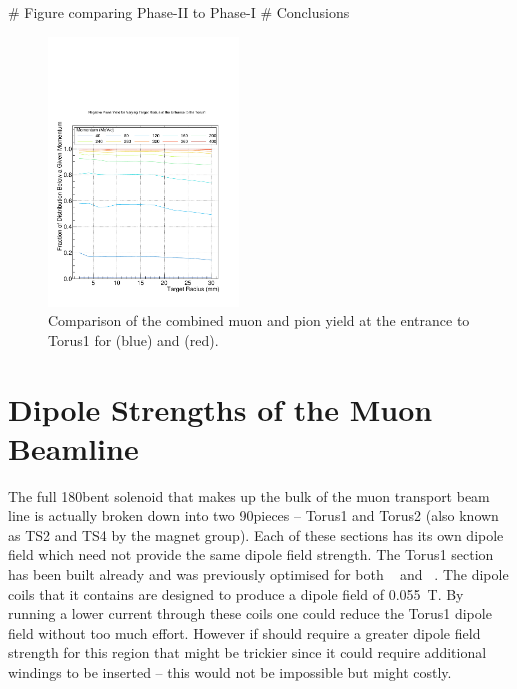 \begin{easylist}
	# Figure comparing Phase-II to Phase-I
	# Conclusions
\end{easylist}

\begin{figure}[t]
\centering
\includegraphics[width=0.45\textwidth,trim=0 0 0 1.5cm,clip]{figs/optimisation/ProdTgtGeom/Radius_pi-minus_integral_ratios}
\caption{
Comparison of the combined muon and pion yield at the entrance to Torus1 for \phaseI (blue) and \phaseII (red).
}
\end{figure}

\section{Dipole Strengths of the Muon Beamline}

The full 180\degree bent solenoid that makes up the bulk of the muon transport beam line is actually broken down into two
90\degree pieces -- Torus1 and Torus2 (also known as TS2 and TS4 by the magnet group).
Each of these sections has its own dipole field which need not provide the same dipole field strength.
The Torus1 section has been built already and was previously optimised for both \phaseI~\cite{TDR2016} and \phaseII~\cite{CDRphase2}. 
The dipole coils that it contains are designed to produce a dipole field of 0.055~T.
By running a lower current through these coils one could reduce the Torus1 dipole field without too much effort. 
However if \phaseII should require a greater dipole field strength for this region
that might be trickier since it could require additional windings to be inserted -- this would not be impossible but might costly.

